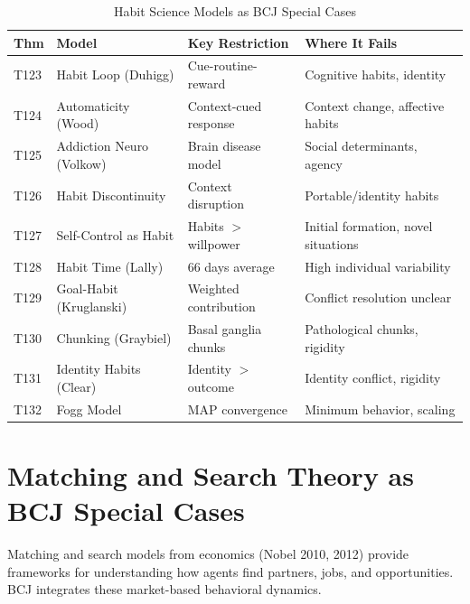 \begin{table}[htbp]
\centering
\caption{Habit Science Models as BCJ Special Cases}
\label{tab:habit-boundaries}
\renewcommand{\arraystretch}{1.2}
\begin{tabular}{@{}llp{3.5cm}p{4cm}@{}}
\toprule
\textbf{Thm} & \textbf{Model} & \textbf{Key Restriction} & \textbf{Where It Fails} \\
\midrule
T123 & Habit Loop (Duhigg) & Cue-routine-reward & Cognitive habits, identity \\
T124 & Automaticity (Wood) & Context-cued response & Context change, affective habits \\
T125 & Addiction Neuro (Volkow) & Brain disease model & Social determinants, agency \\
T126 & Habit Discontinuity & Context disruption & Portable/identity habits \\
T127 & Self-Control as Habit & Habits $>$ willpower & Initial formation, novel situations \\
T128 & Habit Time (Lally) & 66 days average & High individual variability \\
T129 & Goal-Habit (Kruglanski) & Weighted contribution & Conflict resolution unclear \\
T130 & Chunking (Graybiel) & Basal ganglia chunks & Pathological chunks, rigidity \\
T131 & Identity Habits (Clear) & Identity $>$ outcome & Identity conflict, rigidity \\
T132 & Fogg Model & MAP convergence & Minimum behavior, scaling \\
\bottomrule
\end{tabular}
\end{table}



\section{Matching and Search Theory as BCJ Special Cases}
\label{sec:matching-search}

Matching and search models from economics (Nobel 2010, 2012) provide frameworks for understanding how agents find partners, jobs, and opportunities. BCJ integrates these market-based behavioral dynamics.


